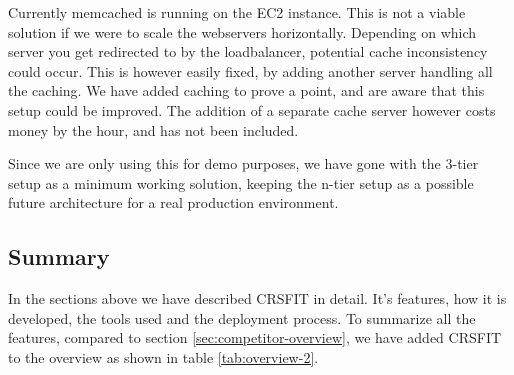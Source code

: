 Currently memcached is running on the EC2 instance. This is not a viable solution if we were to scale the webservers horizontally. Depending on which server you get redirected to by the loadbalancer, potential cache inconsistency could occur. This is however easily fixed, by adding another server handling all the caching. We have added caching to prove a point, and are aware that this setup could be improved. The addition of a separate cache server however costs money by the hour, and has not been included.

Since we are only using this for demo purposes, we have gone with the 3-tier setup as a minimum working solution, keeping the n-tier setup as a possible future architecture for a real production environment.






\subsection{Summary}
In the sections above we have described CRSFIT in detail. It's features, how it is developed, the tools used and the deployment process. To summarize all the features, compared to section  \ref{sec:competitor-overview}, we have added CRSFIT to the overview as shown in table \ref{tab:overview-2}.


